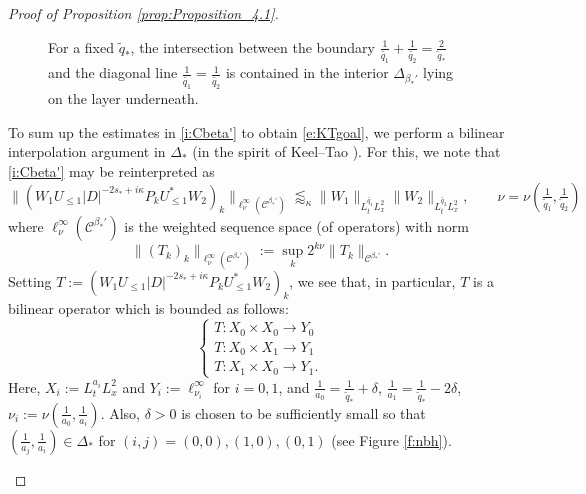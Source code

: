 \documentclass[a4paper]{amsart}
\numberwithin{equation}{section}%
\theoremstyle{plain}%
\theoremstyle{definition}
\theoremstyle{remark}%
\def\C{\mathcal{C}}
\def\C{\mathcal{C}}
\begin{document}
\begin{proof}[Proof of Proposition \ref{prop:Proposition_4.1}]
\begin{figure}[t]
\begin{center}
\begin{tikzpicture}[rotate around x=-100, rotate around y=0,rotate around z=-5,scale=5]
\end{tikzpicture}
\caption{
For a fixed $\widetilde{q}_*$, the intersection between the boundary $\frac{1}{\widetilde{q_1}}+\frac{1}{\widetilde{q_2}}=\frac{2}{\widetilde{q}_*}$ and the diagonal line $\frac{1}{\widetilde{q_1}}=\frac{1}{\widetilde{q_2}}$ is contained in the interior $\Delta_{\beta_*'}$ lying on the layer underneath.
}\label{f:3d}
\end{center}
\end{figure}
To sum up the estimates in \eqref{i:Cbeta'} to obtain \eqref{e:KTgoal}, we perform a bilinear interpolation argument in $\Delta_*$ (in the spirit of Keel--Tao \cite{KeelTao}). For this, we note that \eqref{i:Cbeta'} may be reinterpreted as 
\[
\|(W_1U_{\leq 1}|D|^{-2s_*+i\kappa}P_kU_{\leq 1}^*W_2)_k\|_{\ell_{\nu}^\infty(\C^{\beta_*'})}
\lessapprox_\kappa
\|W_1\|_{L_t^{\widetilde{q_1}}L_x^2}\|W_2\|_{L_t^{\widetilde{q_2}}L_x^2}, \qquad \nu = \nu(\tfrac{1}{\widetilde{q}_1},\tfrac{1}{\widetilde{q}_2})
\]
where $\ell^\infty_\nu(\C^{\beta_*'})$ is the weighted sequence space (of operators) with norm
\[
\|(T_k)_k\|_{\ell_{\nu}^\infty(\C^{\beta_*'})}
:= \sup_{k}2^{k\nu}\|T_k\|_{\C^{\beta_*'}}.
\]
Setting $T := (W_1U_{\leq 1}|D|^{-2s_*+i\kappa}P_kU_{\leq 1}^*W_2)_k$, we see that, in particular, $T$ is a bilinear operator which is bounded as follows:
\[
\begin{cases}
T:X_0\times X_0\to Y_0\\
T:X_0\times X_1\to Y_1\\
T:X_1\times X_0\to Y_1.
\end{cases}
\]
Here, $X_i := L^{a_i}_tL^2_x$ and $Y_i := \ell^\infty_{\nu_i}$ for $i=0,1$, and $\frac{1}{a_0}=\frac{1}{\widetilde{q}_*}+\delta$, $\frac{1}{a_1}=\frac{1}{\widetilde{q}_*}-2\delta$, $\nu_i := \nu(\tfrac{1}{a_0},\tfrac{1}{a_i})$. Also, $\delta > 0$ is chosen to be sufficiently small so that $(\tfrac{1}{a_j},\tfrac{1}{a_i}) \in \Delta_*$ for $(i,j) = (0,0), (1,0), (0,1)$ (see Figure \ref{f:nbh}). 
\begin{figure}[t]
\begin{center}
\end{center}
\end{figure}
\end{proof}
\end{document}
